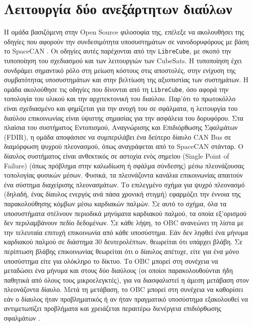 \documentclass[a4paper,nobib,justified]{tufte-book}
\begin{document}
\section{Λειτουργία δύο ανεξάρτητων διαύλων}
Η ομάδα βασιζόμενη στην Open Source φιλοσοφία της, επέλεξε να ακολουθήσει της οδηγίες που αφορούν την συνδεσιμότητα υποσυστημάτων σε νανοδορυφόρους με βάση το SpaceCAN . Οι οδηγίες αυτές παρέχονται από την \texttt{LibreCube}, με σκοπό την τυποποίηση του σχεδιασμού και των λειτουργιών των CubeSats. Η τυποποίηση έχει συνδράμει σημαντικό ρόλο στη μείωση κόστους στις αποστολές, στην ενίχυση της συμβατότητας υποσυστημάτων και στην βελτίωση της αξιοπιστίας των συστημάτων. Η ομάδα ακολούθησε τις οδηγίες που δίνονται από τη \texttt{LibreCube}, όσο αφορά την τοπολογία του υλικού και την αρχιτεκτονική του διαύλου. 
Παρ'ότι το πρωτοκόλλο είναι σχεδιασμένο και φημίζεται για την ανοχή του σε σφάλματα, η λειτουργία του διαύλου επικοινωνίας είναι ύψιστης σημασίας για την ασφάλεια του δορυφόρου. Στα πλαίσια του συστήματος Εντοπισμού, Αναγνώρισης και Επιδιόρθωσης Σφαλμάτων (FDIR), η ομάδα αποφάσισε να συμπεριλάβει ένα δεύτερο δίαυλο CAN Bus σε διαμόρφωση ψυχρού πλεονασμού, όπως αναγράφεται από το SpaceCAN στάνταρ. Ο δίαυλος συστήματος είναι ανθεκτικός σε αστοχία ενός σημείου (Single Point of Failure) (όπως πρόβλημα στην καλωδίωση ή σφάλμα σύνδεσης) μέσω πλεονάζουσας τοπολογίας φυσικών μέσων. Φυσικά, τα πλεονάζοντα κανάλια επικοινωνίας απαιτούν ένα σύστημα διαχείρισης πλεονασμάτων. Το επιλεγμένο σχήμα για ψυχρό πλεονασμό (δηλαδή, ένας δίαυλος ενεργός ανά πάσα χρονική στιγμή) εφαρμόζει την έννοια της παρακολούθησης κόμβων μέσω καρδιακών παλμών. Σε αυτό το σχήμα, όλα τα υποσυστήματα στέλνουν περιοδικά μηνύματα καρδιακού παλμού, τα οποία εξ'ορισμού δεν περιλαμβάνουν πεδίο δεδομένων. Σε κάθε λήψη, το OBC ανανεώνει τη λίστα με την τελευταία επιτυχή επικοινωνία από κάθε υποσύστημα. Εάν δεν ληφθεί ένα μήνυμα καρδιακού παλμού σε διάστημα 30 δευτερολέπτων, θεωρείται ότι υπάρχει βλάβη. Σε περίπτωση βλάβης επικοινωνίας θεωρείται ότι ο δίαυλος απέτυχε, είτε για ένα μόνο υποσύστημα είτε για ολόκληρο το δίκτυο. Το OBC μπορεί στη συνέχεια να μεταδώσει ένα μήνυμα και στους δύο διαύλους (οι οποίοι παρακολουθούνται ήδη παθητικά από όλους τους μικροελεγκτές), για να διασφαλιστεί η άμεση μετάβαση στον πλεονάζοντα δίαυλο. Μετά τη μετάβαση, το OBC μπορεί στη συνέχεια να καθορίσει εάν ο δίαυλος ήταν προβληματικός ή αν ήταν πραγματικό υποσύστημα εξακολουθεί να αντιμετωπίζει προβλήματα και χρειάζεται περαιτέρω διενέργεια επιδιόρθωσης σφαλμάτων .
\end{document}
